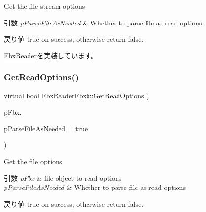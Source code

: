Get the file stream options 
\begin{DoxyParams}{引数}
{\em p\+Parse\+File\+As\+Needed} & Whether to parse file as read options \\
\hline
\end{DoxyParams}
\begin{DoxyReturn}{戻り値}
true on success, otherwise return false. 
\end{DoxyReturn}


\hyperlink{class_fbx_reader_acea3c118db490378c9aed17512396932}{Fbx\+Reader}を実装しています。

\mbox{\label{class_fbx_reader_fbx6_aad5666cba24ae32ea43085227e8497fc}} 
\subsubsection{\texorpdfstring{Get\+Read\+Options()}{GetReadOptions()}\hspace{0.1cm}{\footnotesize\ttfamily [2/2]}}
{\footnotesize\ttfamily virtual bool Fbx\+Reader\+Fbx6\+::\+Get\+Read\+Options (\begin{DoxyParamCaption}\item[{\hyperlink{class_fbx_i_o}{Fbx\+IO} $\ast$}]{p\+Fbx,  }\item[{bool}]{p\+Parse\+File\+As\+Needed = {\ttfamily true} }\end{DoxyParamCaption})\hspace{0.3cm}{\ttfamily [virtual]}}

Get the file options 
\begin{DoxyParams}{引数}
{\em p\+Fbx} & file object to read options \\
\hline
{\em p\+Parse\+File\+As\+Needed} & Whether to parse file as read options \\
\hline
\end{DoxyParams}
\begin{DoxyReturn}{戻り値}
true on success, otherwise return false. 
\end{DoxyReturn}
\mbox{\label{class_fbx_reader_fbx6_a62e8d566653eccca7e4b7c914f7a9a5e}} 
